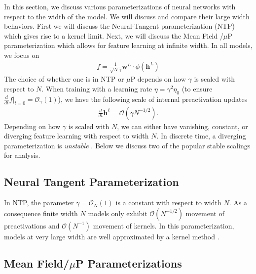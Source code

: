 \documentclass{article} %
\def\h{\bm h}
\def\w{\bm w}
\begin{document}
In this section, we discuss various parameterizations of neural networks with respect to the width of the model. We will discuss and compare their large width behaviors. First we will discuss the Neural-Tangent parameterization (NTP) which gives rise to a kernel limit. Next, we will discuss the Mean Field /$\mu$P parameterization which allows for feature learning at infinite width. In all models, we focus on 
\begin{align}
    f = \frac{1}{\sqrt{N} \gamma} \w^L \cdot \phi(\h^L) 
\end{align}
The choice of whether one is in NTP or $\mu$P depends on how $\gamma$ is scaled with respect to $N$. When training with a learning rate $\eta = \gamma^2 \eta_0$ (to ensure $\frac{d}{dt} f|_{t=0} = \mathcal{O}_\gamma(1)$), we have the following scale of internal preactivation updates \citep{bordelon2022self}
\begin{align}
    \frac{d}{dt} \h^\ell = \mathcal{O}(\gamma N^{-1/2}) .
\end{align}
Depending on how $\gamma$ is scaled with $N$, we can either have vanishing, constant, or diverging feature learning with respect to width $N$. In discrete time, a diverging parameterization is \textit{unstable} \citep{yang2021tensor}. Below we discuss two of the popular stable scalings for analysis.

\subsection{Neural Tangent Parameterization}
In NTP, the parameter $\gamma = \mathcal{O}_N(1)$ is a constant with respect to width $N$. As a consequence finite width $N$ models only exhibit $\mathcal{O}(N^{-1/2})$ movement of preactivations and $\mathcal{O}(N^{-1})$ movement of kernels. In this parameterization, models at very large width are well approximated by a kernel method \citep{jacot2018neural, lee2019wide}.
 
\subsection{Mean Field/$\mu$P Parameterizations}
\end{document}
